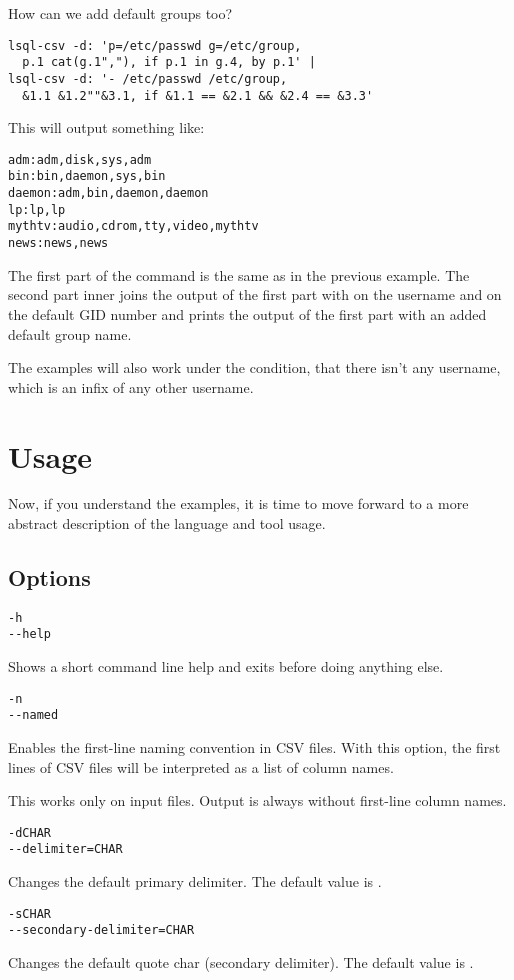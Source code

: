 How can we add default groups too?
\begin{verbatim}
lsql-csv -d: 'p=/etc/passwd g=/etc/group, 
  p.1 cat(g.1","), if p.1 in g.4, by p.1' |
lsql-csv -d: '- /etc/passwd /etc/group, 
  &1.1 &1.2""&3.1, if &1.1 == &2.1 && &2.4 == &3.3'
\end{verbatim}
This will output something like:
\begin{verbatim}
adm:adm,disk,sys,adm
bin:bin,daemon,sys,bin
daemon:adm,bin,daemon,daemon
lp:lp,lp
mythtv:audio,cdrom,tty,video,mythtv
news:news,news
\end{verbatim}

The first part of the command is the same as in the previous example. The second part inner joins the output
of the first part with  on the username and  on the default GID number and prints
the output of the first part with an added default group name.

The examples will also work under the condition, that there isn’t any username,
which is an infix of any other username.

\section{Usage}
Now, if you understand the examples, it is time to move forward to a more abstract description of the language and tool usage.

\subsection{Options}
\begin{verbatim}
-h
--help
\end{verbatim}
Shows a short command line help and exits before doing anything else.

\begin{verbatim}
-n
--named
\end{verbatim}
Enables the first-line naming convention in CSV files. 
With this option, the first lines of CSV files will be interpreted as a list of column names.

This works only on input files. 
Output is always without first-line column names.

\begin{verbatim}
-dCHAR
--delimiter=CHAR
\end{verbatim}
Changes the default primary delimiter. The default value is \icode{,}.

\begin{verbatim}
-sCHAR
--secondary-delimiter=CHAR
\end{verbatim}
Changes the default quote char (secondary delimiter). The default value is .

